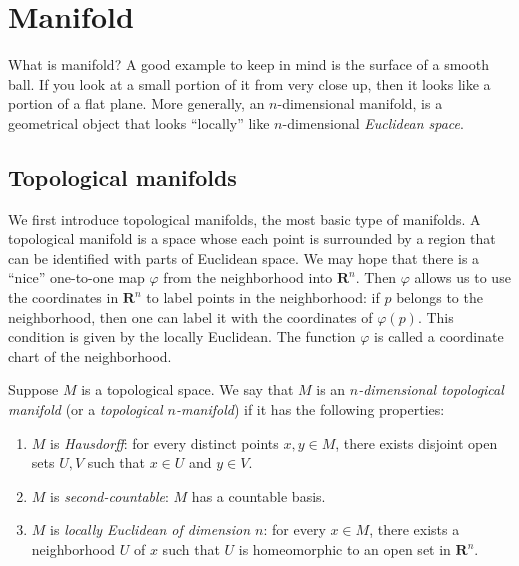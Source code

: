 
\chapter{Manifold}

What is manifold? A good example to keep in mind is the surface of a smooth ball. If you look at a small portion of it from very close up, then it looks like a portion of a flat plane. More generally, an $n$-dimensional manifold, is a geometrical object that looks ``locally'' like $n$-dimensional \emph{Euclidean space}.


\section{Topological manifolds}

We first introduce topological manifolds, the most basic type of manifolds. A topological manifold is a space whose each point is surrounded by a region that can be identified with parts of Euclidean space. We may hope that there is a ``nice'' one-to-one map $\varphi$ from the neighborhood into $\mathbf{R}^n$. Then $\varphi$ allows us to use the coordinates in $\mathbf{R}^n$ to label points in the neighborhood: if $p$ belongs to the neighborhood, then one can label it with the coordinates of $\varphi(p)$. This condition is given by the locally Euclidean. The function $\varphi$ is called a coordinate chart of the neighborhood.

\begin{definition}[Topological manifold]
    Suppose $M$ is a topological space. We say that $M$ is an \emph{$n$-dimensional topological manifold} (or a \emph{topological $n$-manifold}) if it has the following properties:
    \begin{enumerate}
        \item $M$ is \emph{Hausdorff}: for every distinct points $x, y \in M$, there exists disjoint open sets $U, V$ such that $x \in U$ and $y \in V$.
        \item $M$ is \emph{second-countable}: $M$ has a countable basis.
        \item $M$ is \emph{locally Euclidean of dimension $n$}: for every $x \in M$, there exists a neighborhood $U$ of $x$ such that $U$ is homeomorphic to an open set in $\mathbf{R}^n$.
    \end{enumerate}
\end{definition}

